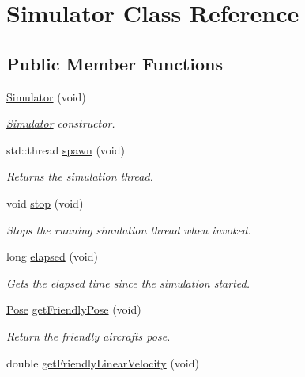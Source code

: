 \hypertarget{classSimulator}{}\section{Simulator Class Reference}
\label{classSimulator}
\subsection*{Public Member Functions}
\begin{DoxyCompactItemize}
\item 
\hyperlink{classSimulator_a62ab66763cb9e6cccbe88d45ab55547f}{Simulator} (void)
\begin{DoxyCompactList}\small\item\em \hyperlink{classSimulator}{Simulator} constructor. \end{DoxyCompactList}\item 
std\+::thread \hyperlink{classSimulator_a19ad57d2e32486e1cce2d8702060d930}{spawn} (void)
\begin{DoxyCompactList}\small\item\em Returns the simulation thread. \end{DoxyCompactList}\item 
\mbox{\label{classSimulator_ae88ecc16eb03836e8b4a355836d7500b}} 
void \hyperlink{classSimulator_ae88ecc16eb03836e8b4a355836d7500b}{stop} (void)
\begin{DoxyCompactList}\small\item\em Stops the running simulation thread when invoked. \end{DoxyCompactList}\item 
long \hyperlink{classSimulator_acd0a0ca3e9d25ea92ffc05e14b77c5e6}{elapsed} (void)
\begin{DoxyCompactList}\small\item\em Gets the elapsed time since the simulation started. \end{DoxyCompactList}\item 
\hyperlink{structPose}{Pose} \hyperlink{classSimulator_ab498029a37713969af417acfa7208d08}{get\+Friendly\+Pose} (void)
\begin{DoxyCompactList}\small\item\em Return the friendly aircraft\textquotesingle{}s pose. \end{DoxyCompactList}\item 
double \hyperlink{classSimulator_a17d07e629ef87450d91d960c2e6b231e}{get\+Friendly\+Linear\+Velocity} (void)

\end{DoxyCompactItemize}
